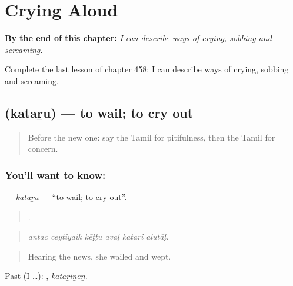 
\chapter{Crying Aloud}
\label{ch:ta-crying-aloud}

\begin{chapteropening}
\textbf{By the end of this chapter:} \emph{I can describe ways of crying, sobbing and screaming.}

Complete the last lesson of chapter 458: I can describe ways of crying, sobbing and screaming.
\end{chapteropening}

\section[\texorpdfstring{\ta{கதறு} (kataṟu)}{கதறு (kataṟu)}]{ (kataṟu) — to wail; to cry out}

\label{lesson:TA-C458-kataru}



\begin{quote}
Before the new one: say the Tamil for pitifulness, then the Tamil for concern.
\end{quote}

\subsection*{You'll want to know: }
\textbf{} — \emph{kataṟu} — \textquotedblleft{}to wail; to cry out\textquotedblright{}.

\begin{quote}
     .
\end{quote}

\begin{quote}
\emph{antac ceytiyaik kēṭṭu avaḷ kataṟi aḻutāḷ.}
\end{quote}

\begin{quote}
Hearing the news, she wailed and wept.
\end{quote}

Past (I …): , \emph{kataṟiṉēṉ}.

